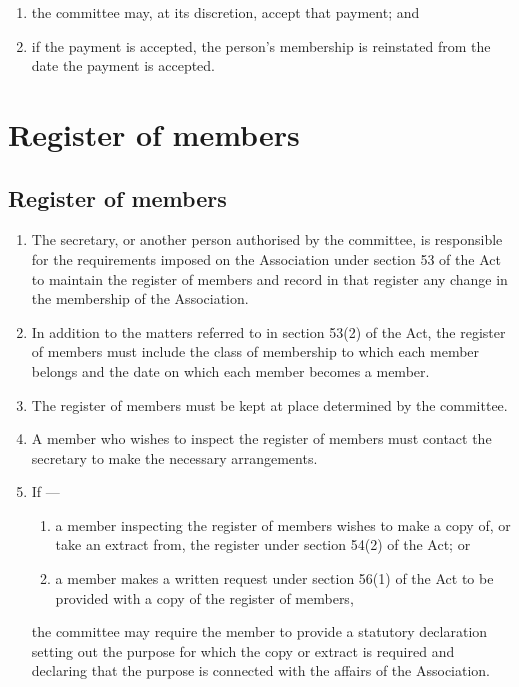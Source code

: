\documentclass[../constitution.tex]{subfiles}
\begin{document}
\begin{enumerate}
  \begin{enumerate}
  
  \item the committee may, at its discretion, accept that payment; and
  \item if the payment is accepted, the person's membership is reinstated from the date the payment is accepted.
  \end{enumerate}
\end{enumerate}

\hypertarget{division-3-register-of-members}{%
\section{Register of members}\label{division-3-register-of-members}}

\hypertarget{register-of-members}{%
\subsection{Register of members}\label{register-of-members}}

\begin{enumerate}

\item The secretary, or another person authorised by the committee, is responsible for the requirements imposed on the Association under section 53 of the Act to maintain the register of members and record in that register any change in the membership of the Association.
\item In addition to the matters referred to in section 53(2) of the Act, the register of members must include the class of membership  to which each member belongs and the date on which each member becomes a member.
\item The register of members must be kept at  place determined by the committee. 
\item A member who wishes to inspect the register of members must contact the secretary to make the necessary arrangements.
\item If ---

  \begin{enumerate}
  \item a member inspecting the register of members wishes to make a copy of, or take an extract from, the register under section 54(2) of the Act; or
  \item a member makes a written request under section 56(1) of the Act to be provided with a copy of the register of members,

  \end{enumerate}
  the committee may require the member to provide a statutory declaration setting out the purpose for which the copy or extract is required and declaring that the purpose is connected with the affairs of the Association.
\end{enumerate}
\end{document}

